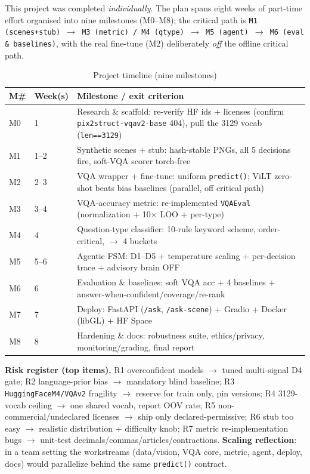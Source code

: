 \documentclass[12pt,a4paper]{article}
\begin{document}
This project was completed \textit{individually}. The plan spans eight weeks of part-time effort organised into nine milestones (M0--M8); the critical path is \texttt{M1 (scenes+stub) $\rightarrow$ M3 (metric) / M4 (qtype) $\rightarrow$ M5 (agent) $\rightarrow$ M6 (eval \& baselines)}, with the real fine-tune (M2) deliberately \emph{off} the offline critical path.

\begin{table}[H]
\centering
\caption{Project timeline (nine milestones)}
\small
\begin{tabularx}{\linewidth}{@{} l l L @{}}
\toprule
\textbf{M\#} & \textbf{Week(s)} & \textbf{Milestone / exit criterion} \\
\midrule
M0 & 1 & Research \& scaffold: re-verify HF ids + licenses (confirm \texttt{pix2struct-vqav2-base} 404), pull the 3129 vocab (\texttt{len==3129}) \\
M1 & 1--2 & Synthetic scenes + stub: hash-stable PNGs, all 5 decisions fire, soft-VQA scorer torch-free \\
M2 & 2--3 & VQA wrapper + fine-tune: uniform \texttt{predict()}; ViLT zero-shot beats bias baselines (parallel, off critical path) \\
M3 & 3--4 & VQA-accuracy metric: re-implemented \texttt{VQAEval} (normalization + 10$\times$ LOO + per-type) \\
M4 & 4 & Question-type classifier: 10-rule keyword scheme, order-critical, $\rightarrow$ 4 buckets \\
M5 & 5--6 & Agentic FSM: D1--D5 + temperature scaling + per-decision trace + advisory brain OFF \\
M6 & 6 & Evaluation \& baselines: soft VQA acc + 4 baselines + answer-when-confident/coverage/re-rank \\
M7 & 7 & Deploy: FastAPI (\texttt{/ask}, \texttt{/ask-scene}) + Gradio + Docker (libGL) + HF Space \\
M8 & 8 & Hardening \& docs: robustness suite, ethics/privacy, monitoring/grading, final report \\
\bottomrule
\end{tabularx}
\end{table}

\textbf{Risk register (top items).} R1 overconfident models $\rightarrow$ tuned multi-signal D4 gate; R2 language-prior bias $\rightarrow$ mandatory blind baseline; R3 \texttt{HuggingFaceM4/VQAv2} fragility $\rightarrow$ reserve for train only, pin versions; R4 3129-vocab ceiling $\rightarrow$ one shared vocab, report OOV rate; R5 non-commercial/undeclared licenses $\rightarrow$ ship only declared-permissive; R6 stub too easy $\rightarrow$ realistic distribution + difficulty knob; R7 metric re-implementation bugs $\rightarrow$ unit-test decimals/commas/articles/contractions. \textbf{Scaling reflection}: in a team setting the workstreams (data/vision, VQA core, metric, agent, deploy, docs) would parallelize behind the same \texttt{predict()} contract.
\end{document}
